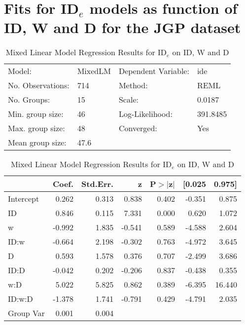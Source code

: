 \documentclass{article}
\begin{document}
\section{Fits for ID$_e$ models as function of ID, W and D for the JGP dataset}
\begin{table}
	\caption{Mixed Linear Model Regression Results for ID$_e$ on ID, W and D}
	\label{tab:fit_jgp_ide_id_full}
	\begin{center}
		\begin{tabular}{llll}
			\hline
			Model:            & MixedLM & Dependent Variable: & ide       \\
			No. Observations: & 714     & Method:             & REML      \\
			No. Groups:       & 15      & Scale:              & 0.0187    \\
			Min. group size:  & 46      & Log-Likelihood:     & 391.8485  \\
			Max. group size:  & 48      & Converged:          & Yes       \\
			Mean group size:  & 47.6    &                     &           \\
			\hline
			\end{tabular}
			\end{center}
			
			\begin{center}
			\begin{tabular}{lrrrrrr}
			\hline
					  &  Coef. & Std.Err. &      z & P$> |$z$|$ & [0.025 & 0.975]  \\
			\hline
			Intercept &  0.262 &    0.313 &  0.838 &       0.402 & -0.351 &  0.875  \\
			ID        &  0.846 &    0.115 &  7.331 &       0.000 &  0.620 &  1.072  \\
			w         & -0.992 &    1.835 & -0.541 &       0.589 & -4.588 &  2.604  \\
			ID:w      & -0.664 &    2.198 & -0.302 &       0.763 & -4.972 &  3.645  \\
			D         &  0.593 &    1.578 &  0.376 &       0.707 & -2.499 &  3.686  \\
			ID:D      & -0.042 &    0.202 & -0.206 &       0.837 & -0.438 &  0.355  \\
			w:D       &  5.022 &    5.825 &  0.862 &       0.389 & -6.395 & 16.440  \\
			ID:w:D    & -1.378 &    1.741 & -0.791 &       0.429 & -4.791 &  2.035  \\
			Group Var &  0.001 &    0.004 &        &             &        &         \\
			\hline
			\end{tabular}
			\end{center}
			\end{table}
\end{document}
